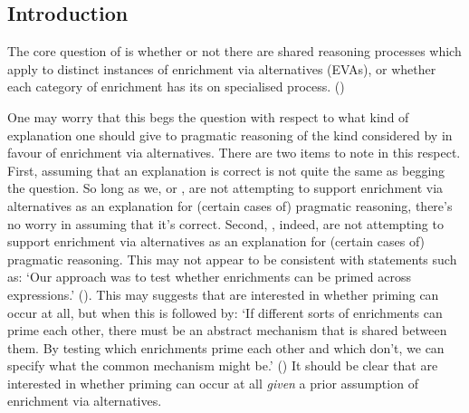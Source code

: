 \documentclass[10pt]{article}
\begin{document}
\begin{multicols}{2}



\section{Introduction}
\label{sec:introduction}

The core question of \textcite{Bott:2016aa} is whether or not there are shared reasoning processes which apply to distinct instances of enrichment via alternatives (EVAs), or whether each category of enrichment has its on specialised process.
(\citeyear[118]{Bott:2016aa})

One may worry that this begs the question with respect to what kind of explanation one should give to pragmatic reasoning of the kind considered by \citeauthor{Bott:2016aa} in favour of enrichment via alternatives.
There are two items to note in this respect.
First, assuming that an explanation is correct is not quite the same as begging the question.
So long as we, or \citeauthor{Bott:2016aa}, are not attempting to support enrichment via alternatives as an explanation for (certain cases of) pragmatic reasoning, there's no worry in assuming that it's correct.
Second, \citeauthor{Bott:2016aa}, indeed, are not attempting to support enrichment via alternatives as an explanation for (certain cases of) pragmatic reasoning.
This may not appear to be consistent with statements such as:
`Our approach was to test whether enrichments can be primed across expressions.' (\citeyear[118]{Bott:2016aa}).
This may suggests that \citeauthor{Bott:2016aa} are interested in whether priming can occur at all, but when this is followed by:
`If different sorts of enrichments can prime each other, there must be an abstract mechanism that is shared between them.
By testing which enrichments prime each other and which don’t, we can specify what the common mechanism might be.' (\citeyear[118]{Bott:2016aa})
It should be clear that \citeauthor{Bott:2016aa} are interested in whether priming can occur at all \emph{given} a prior assumption of enrichment via alternatives.


\end{multicols}
\end{document}
